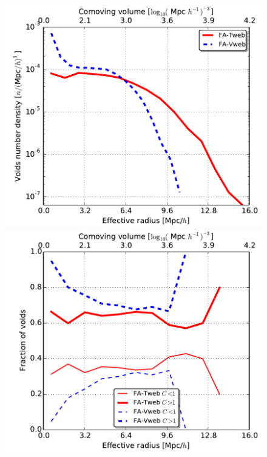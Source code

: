 \documentclass[a4,useAMS,usenatbib,usegraphicx]{mn2e}
\begin{document}
\begin{figure}
\centering

  \includegraphics[trim = 2mm 2mm 2mm 0mm, clip, keepaspectratio=true,
  width=0.35\textheight]{voids_regions_volume_all.pdf}
  \includegraphics[trim = 2mm 2mm 2mm 0mm, clip, keepaspectratio=true,
  width=0.35\textheight]{voids_regions_volume_compensated.pdf}

  \label{fig:volume_function}

\end{figure}
\end{document}

